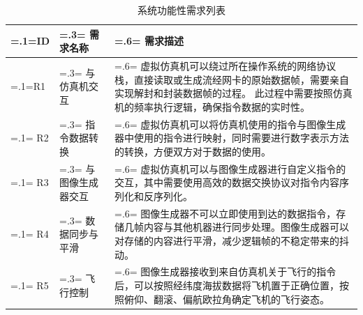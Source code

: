 \begin{table}[h!]
    \begin{center}
        \caption{系统功能性需求列表}
        \label{funcreq}
        \renewcommand\arraystretch{1.5}
        \begin{tabularx}{\textwidth}{ 
            | >{\centering\arraybackslash\hsize=.1\hsize\linewidth=\hsize}X 
            | >{\centering\arraybackslash\hsize=.3\hsize\linewidth=\hsize}X 
            | >{\raggedright\arraybackslash\hsize=.6\hsize\linewidth=\hsize}X 
            | }
            \hline
            \textbf{ID} & \textbf{需求名称} & \textbf{需求描述}\\
            \hline
            R1 & 与仿真机交互 & 虚拟仿真机可以绕过所在操作系统的网络协议栈，直接读取或生成流经网卡的原始数据帧，需要亲自实现解封和封装数据帧的过程。
                               此过程中需要按照仿真机的频率执行逻辑，确保指令数据的实时性。\\
            \hline
            R2 & 指令数据转换 & 虚拟仿真机可以将仿真机使用的指令与图像生成器中使用的指令进行映射，同时需要进行数字表示方法的转换，方便双方对于数据的使用。\\
            \hline 
            R3 & 与图像生成器交互 & 虚拟仿真机可以与图像生成器进行自定义指令的交互，其中需要使用高效的数据交换协议对指令内容序列化和反序列化。\\
            \hline 
            R4 & 数据同步与平滑 & 图像生成器不可以立即使用到达的数据指令，存储几帧内容与其他机器进行同步处理。图像生成器可以对存储的内容进行平滑，减少逻辑帧的不稳定带来的抖动。\\
            \hline
            R5 & 飞行控制 & 图像生成器接收到来自仿真机关于飞行的指令后，可以按照经纬度海拔数据将飞机置于正确位置，按照俯仰、翻滚、偏航欧拉角确定飞机的飞行姿态。\\
            \hline
        \end{tabularx}
    \end{center}
\end{table}
\newpage
